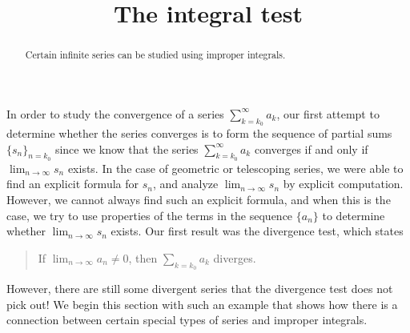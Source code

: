 \documentclass{ximera}
\title[Dig-In:]{The integral test}
\begin{document}
\begin{abstract}
Certain infinite series can be studied using improper integrals.
\end{abstract}
\maketitle

In order to study the convergence of a series $\sum_{k=k_0}^{\infty} a_k$, our first attempt to determine whether the series converges is to form the sequence of partial sums $\{s_n\}_{n=k_0}$ since we know that the series $\sum_{k=k_0}^{\infty} a_k$ converges if and only if $\lim_{n \to \infty} s_n$ exists.  In the case of geometric or telescoping series, we were able to find an explicit formula for $s_n$, and analyze $\lim_{n \to \infty} s_n$ by explicit computation.  However, we cannot always find such an explicit formula, and when this is the case, we try to use properties of the terms in the sequence $\{a_n\}$ to determine whether $\lim_{n \to \infty} s_n$ exists.  Our first result was the divergence test, which states

\begin{quote}
If $\lim_{n \to \infty} a_n \neq 0$, then $\sum_{k=k_0} a_k$ diverges.
\end{quote}

However, there are still some divergent series that the divergence test does not pick out!  We begin this section with such an example that shows how there is a connection between certain special types of series and improper integrals.
\end{document}
